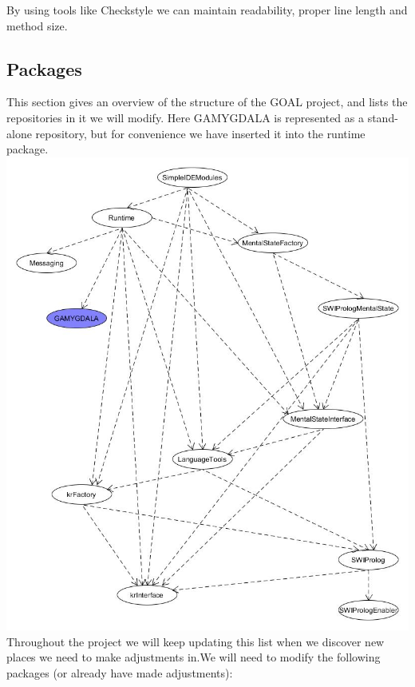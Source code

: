 \documentclass[]{article}
\begin{document}
By using tools like Checkstyle we can maintain readability, proper line length and method size.
\newpage
\subsection{Packages}
This section gives an overview of the structure of the GOAL project, and lists the repositories in it we will modify. Here GAMYGDALA is represented as a stand-alone repository, but for convenience we have inserted it into the runtime package.\\
\includegraphics[scale = 0.5]{Maven_dependency_tree_UML.jpg}\\
\newpage
Throughout the project we will keep updating this list when we discover new places we need to make adjustments in.We will need to modify the following packages (or already have made adjustments):
\end{document}
